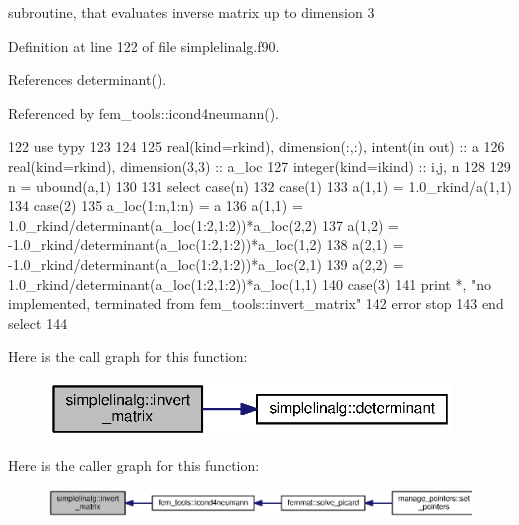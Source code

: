 subroutine, that evaluates inverse matrix up to dimension 3 



Definition at line 122 of file simplelinalg.\+f90.



References determinant().



Referenced by fem\+\_\+tools\+::icond4neumann().


\begin{DoxyCode}
122       \textcolor{keywordtype}{use }typy
123 
124 
125       \textcolor{keywordtype}{real(kind=rkind)}, \textcolor{keywordtype}{dimension(:,:)}, \textcolor{keywordtype}{intent(in out)} :: a
126       \textcolor{keywordtype}{real(kind=rkind)}, \textcolor{keywordtype}{dimension(3,3)} :: a\_loc
127       \textcolor{keywordtype}{integer(kind=ikind)} :: i,j, n
128 
129       n = ubound(a,1)
130 
131       \textcolor{keywordflow}{select case}(n)
132         \textcolor{keywordflow}{case}(1)
133             a(1,1) = 1.0\_rkind/a(1,1)
134         \textcolor{keywordflow}{case}(2)
135             a\_loc(1:n,1:n) = a
136             a(1,1) = 1.0\_rkind/determinant(a\_loc(1:2,1:2))*a\_loc(2,2)
137             a(1,2) = -1.0\_rkind/determinant(a\_loc(1:2,1:2))*a\_loc(1,2)
138             a(2,1) = -1.0\_rkind/determinant(a\_loc(1:2,1:2))*a\_loc(2,1)
139             a(2,2) =  1.0\_rkind/determinant(a\_loc(1:2,1:2))*a\_loc(1,1)
140         \textcolor{keywordflow}{case}(3)
141             print *, \textcolor{stringliteral}{"no implemented, terminated from fem\_tools::invert\_matrix"}
142             error stop
143 \textcolor{keywordflow}{      end select}
144 
\end{DoxyCode}


Here is the call graph for this function\+:\nopagebreak
\begin{figure}[H]
\begin{center}
\leavevmode
\includegraphics[width=303pt]{namespacesimplelinalg_a443d39cabe9830ddbb7e553cb510cad4_cgraph}
\end{center}
\end{figure}




Here is the caller graph for this function\+:\nopagebreak
\begin{figure}[H]
\begin{center}
\leavevmode
\includegraphics[width=350pt]{namespacesimplelinalg_a443d39cabe9830ddbb7e553cb510cad4_icgraph}
\end{center}
\end{figure}


